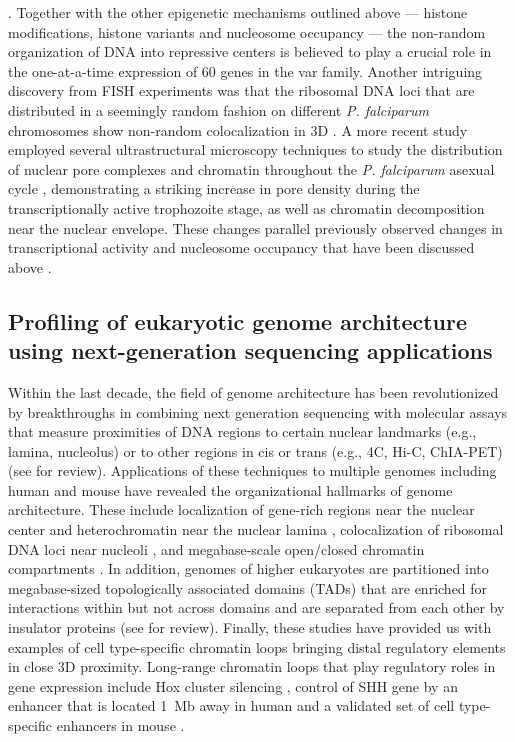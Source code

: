 \citep{lopez-rubio:genome-wide, freitas-junior:frequent, ralph:antigenic}.
Together with the other epigenetic mechanisms outlined above —
histone modifications, histone variants and nucleosome occupancy — the
non-random organization of DNA into repressive centers is believed to play a
crucial role in the one-at-a-time expression of 60 genes in the var family.
Another intriguing discovery from FISH experiments was that the ribosomal DNA
loci that are distributed in a seemingly random fashion on different \textit{P.
falciparum} chromosomes show non-random colocalization in 3D
\citep{mancio-silva:clustering}. A more
recent study employed several ultrastructural microscopy techniques to study
the distribution of nuclear pore complexes and chromatin throughout the
\textit{P.
falciparum} asexual cycle \citep{weiner:3d}, demonstrating a striking increase in pore
density during the transcriptionally active trophozoite stage, as well as
chromatin decomposition near the nuclear envelope. These changes parallel
previously observed changes in transcriptional activity and nucleosome
occupancy that have been discussed above \citep{ponts:nucleosome}.

\subsection{Profiling of eukaryotic genome architecture using next-generation
sequencing applications}

Within the last decade, the field of genome architecture has been
revolutionized by breakthroughs in combining next generation sequencing with
molecular assays that measure proximities of DNA regions to certain nuclear
landmarks (e.g., lamina, nucleolus) or to other regions in cis or trans (e.g.,
4C, Hi-C, ChIA-PET) \citep{duan:three,
lieberman-aiden:comprehensive, fullwood:oestrogen-receptor-alpha-bound,
guelen:domain, koningsbruggen:high-resolution, vogel:detection,
zhao:circular} (see \citep{steensel:genomics} for review).
Applications of these
techniques to multiple genomes including human and mouse have revealed the
organizational hallmarks of genome architecture. These include localization of
gene-rich regions near the nuclear center and heterochromatin near the nuclear
lamina \citep{guelen:domain}, colocalization of ribosomal DNA loci near
nucleoli \citep{koningsbruggen:high-resolution}, and
megabase-scale open/closed chromatin compartments
\citep{lieberman-aiden:comprehensive}. In addition, genomes
of higher eukaryotes are partitioned into megabase-sized topologically
associated domains (TADs) that are enriched for interactions within but not
across domains and are separated from each other by insulator proteins
\citep{dixon:topological, nora:spatial, sofueva:cohesin-mediated}
(see \citep{nora:segmental} 
for review). Finally, these studies have provided us with
examples of cell type-specific chromatin loops bringing distal regulatory
elements in close 3D proximity. Long-range chromatin loops that play
regulatory roles in gene expression include Hox cluster silencing
\citep{ferraiuolo:three-dimensional, rousseau:hox},
control of SHH gene by an enhancer that is located 1~Mb away in human
\citep{li:extensive} and
a validated set of cell type-specific enhancers in mouse \citep{shen:map}.

